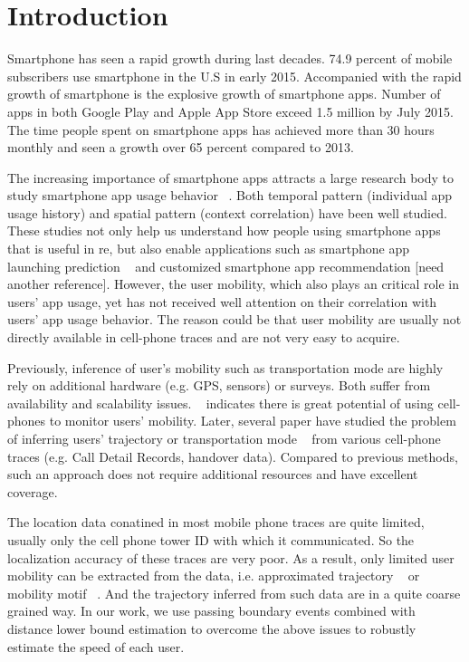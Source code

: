 \section{Introduction}

Smartphone has seen a rapid growth during last decades. 74.9 percent of mobile subscribers use smartphone in the U.S in early 2015. Accompanied with the rapid growth of smartphone is the explosive growth of smartphone apps. Number of apps in both Google Play and Apple App Store exceed 1.5 million by July 2015. The time people spent on smartphone apps has achieved more than 30 hours monthly and seen a growth over 65 percent compared to 2013.

The increasing importance of smartphone apps attracts a large research body to study smartphone app usage behavior ~\cite{xu2011identifying, yang2015characterizing}. Both temporal pattern (individual app usage history) and spatial pattern (context correlation) have been well studied. These studies not only help us understand how people using smartphone apps that is useful in re, but also enable applications such as smartphone app launching prediction ~\cite{yan2012fast} and customized smartphone app recommendation [need another reference]. However, the user mobility, which also plays an critical role in users' app usage, yet has not received well attention on their correlation with users' app usage behavior. The reason could be that user mobility are usually not directly available in cell-phone traces and are not very easy to acquire.

Previously, inference of user's mobility such as transportation mode are highly rely on additional hardware (e.g. GPS, sensors) or surveys. Both suffer from availability and scalability issues. ~\cite{rose2006mobile} indicates there is great potential of using cell-phones to monitor users' mobility. Later, several paper have studied the problem of inferring users' trajectory \cite{Alsolami2012Auth,jiang2013review} or transportation mode  ~\cite{wang2010transportation,doyle2011utilising,bekhor2015investigation} from various cell-phone traces (e.g. Call Detail Records, handover data). Compared to previous methods, such an approach does not require additional resources and have excellent coverage. 

The location data conatined in most mobile phone traces are quite limited, usually only the cell phone tower ID with which it communicated. So the localization accuracy of these traces are very poor. As a result, only limited user mobility can be extracted from the data, i.e. approximated trajectory ~\cite{smoreda2013spatiotemporal, hoteit2014estimating, widhalm2015discovering, Alsolami2012Auth, jiang2013review} or mobility motif ~\cite{wang2014mobile, gambs2012next}. And the trajectory inferred from such data are in a quite coarse grained way. In our work, we use passing boundary events combined with distance lower bound estimation to overcome the above issues to robustly estimate the speed of each user. 


